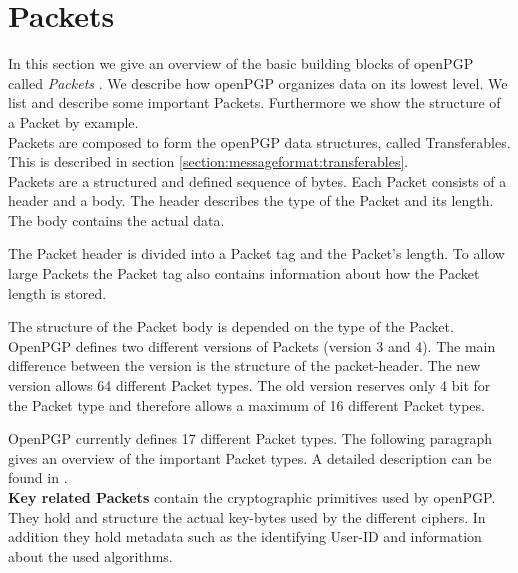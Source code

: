 \section{Packets}
\label{section:messageformat:packets}

In this section we give an overview of the basic building blocks of openPGP called \textit{Packets} \cite[section 5]{RFC4880}. We describe how openPGP organizes data on its lowest level. We list and describe some important Packets. Furthermore we show the structure of a Packet by example.  \\

Packets are composed to form the openPGP data structures, called Transferables. This is described in section \ref{section:messageformat:transferables}. \\

Packets are a structured and defined sequence of bytes.  Each Packet consists of a header and a body. The header describes the type of the Packet and its length. The body contains the actual data.

The Packet header is divided into a Packet tag and the Packet's length. To allow large Packets the Packet tag also contains information about how the Packet length is stored. 

The structure of the Packet body is depended on the type of the Packet. \\


OpenPGP defines two different versions of Packets (version 3 and 4). The main difference between the version is the structure of the packet-header. The new version allows 64 different Packet types. The old version reserves only 4 bit for the Packet type and therefore allows a maximum of 16 different Packet types.

OpenPGP currently defines 17 different Packet types. The following paragraph gives an overview of the important Packet types. A detailed description can be found in \cite[section 5]{RFC4880}. \\ 


\textbf{Key related Packets} contain the cryptographic primitives used by openPGP. They hold and structure the actual key-bytes used by the different ciphers. In addition they hold metadata such as the identifying User-ID and information about the used algorithms.

